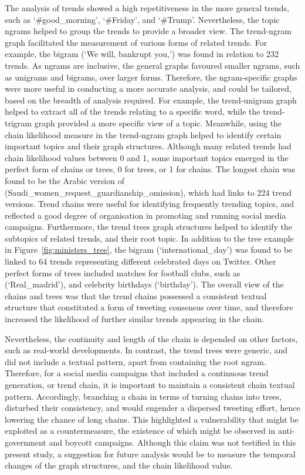 \documentclass[utf8]{frontiersSCNS} %
\begin{document}
{The analysis of trends showed a high repetitiveness in the more general trends, such as ‘\#good\_morning’, ‘\#Friday’, and ‘\#Trump’. Nevertheless, the topic ngrams helped to group the trends to provide a broader view. The trend-ngram graph facilitated the measurement of various forms of related trends.  For example, the bigram (‘We will, bankrupt you,’) was found in relation to 232 trends. As ngrams are inclusive, the general graphs favoured smaller ngrams, such as unigrams and bigrams, over larger forms. Therefore, the ngram-specific graphs were more useful in conducting a more accurate analysis, and could be tailored, based on the breadth of analysis required.  For example, the trend-unigram graph helped to extract all of the trends relating to a specific word, while the trend-trigram graph provided a more specific view of a topic.  Meanwhile, using the chain likelihood measure in the trend-ngram graph helped to identify certain important topics and their graph structures. Although many related trends had chain likelihood values between 0 and 1, some important topics emerged in the perfect form of chains or trees, 0 for trees, or 1 for chains.  The longest chain was found to be the Arabic version of (Saudi\_women\_request\_guardianship\_omission), which had links to 224 trend versions. Trend chains were useful for identifying frequently trending topics, and reflected a good degree of organisation in promoting and running social media campaigns. Furthermore, the trend trees graph structures helped to identify the subtopics of related trends, and their root topic. In addition to the tree example in Figure~\ref{fig:ministers_tree}, the bigram (‘international\_day’) was found to be linked to 64 trends representing different celebrated days on Twitter. Other perfect forms of trees included matches for football clubs, such as (‘Real\_madrid’), and celebrity birthdays (‘birthday’).  The overall view of the chains and trees was that the trend chains possessed a consistent textual structure that constituted a form of tweeting consensus over time, and therefore increased the likelihood of further similar trends appearing in the chain. 


Nevertheless, the continuity and length of the chain is depended on other factors, such as real-world developments. In contrast, the trend trees were generic, and did not include a textual pattern, apart from containing the root ngram.  Therefore, for a social media campaigns that included a continuous trend generation, or trend chain, it is important to maintain a consistent chain textual pattern. Accordingly, branching a chain in terms of turning chains into trees, disturbed their consistency, and would engender a dispersed tweeting effort, hence lowering the chance of long chains.  This highlighted a vulnerability that might be exploited as a countermeasure, the existence of which might be observed in anti-government and boycott campaigns. Although this claim was not testified in this present study, a suggestion for future analysis would be to measure the temporal changes of the graph structures, and the chain likelihood value.  


}
\end{document}
